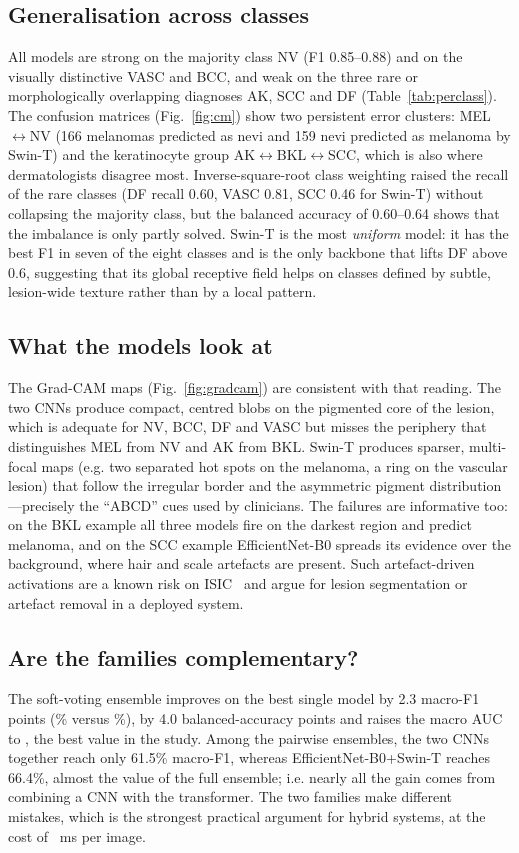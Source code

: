 \subsection{Generalisation across classes}
All models are strong on the majority class NV (F1 0.85--0.88) and on the visually distinctive
VASC and BCC, and weak on the three rare or morphologically overlapping diagnoses AK, SCC and DF
(Table~\ref{tab:perclass}). The confusion matrices (Fig.~\ref{fig:cm}) show two persistent error
clusters: MEL$\leftrightarrow$NV (166 melanomas predicted as nevi and 159 nevi predicted as
melanoma by Swin-T) and the keratinocyte group AK$\leftrightarrow$BKL$\leftrightarrow$SCC, which is
also where dermatologists disagree most. Inverse-square-root class weighting raised the recall of
the rare classes (DF recall 0.60, VASC 0.81, SCC 0.46 for Swin-T) without collapsing the majority
class, but the balanced accuracy of 0.60--0.64 shows that the imbalance is only partly solved.
Swin-T is the most \emph{uniform} model: it has the best F1 in seven of the eight classes and is
the only backbone that lifts DF above 0.6, suggesting that its global receptive field helps on
classes defined by subtle, lesion-wide texture rather than by a local pattern.

\subsection{What the models look at}
The Grad-CAM maps (Fig.~\ref{fig:gradcam}) are consistent with that reading. The two CNNs produce
compact, centred blobs on the pigmented core of the lesion, which is adequate for NV, BCC, DF and
VASC but misses the periphery that distinguishes MEL from NV and AK from BKL. Swin-T produces
sparser, multi-focal maps (e.g. two separated hot spots on the melanoma, a ring on the vascular
lesion) that follow the irregular border and the asymmetric pigment distribution---precisely the
``ABCD'' cues used by clinicians. The failures are informative too: on the BKL example all three
models fire on the darkest region and predict melanoma, and on the SCC example EfficientNet-B0
spreads its evidence over the background, where hair and scale artefacts are present. Such
artefact-driven activations are a known risk on ISIC~\cite{cassidy2022isic} and argue for lesion
segmentation or artefact removal in a deployed system.

\subsection{Are the families complementary?}
The soft-voting ensemble improves on the best single model by 2.3 macro-F1 points
(\EnsFone\% versus \SwinFone\%), by 4.0 balanced-accuracy points and raises the macro AUC to
\EnsAuc{}, the best value in the study. Among the pairwise ensembles, the two CNNs together reach
only 61.5\% macro-F1, whereas EfficientNet-B0+Swin-T reaches 66.4\%, almost the value of the full
ensemble; i.e. nearly all the gain comes from combining a CNN with the transformer. The two
families make different mistakes, which is the strongest practical argument for hybrid systems,
at the cost of \EnsLat{}~ms per image.

